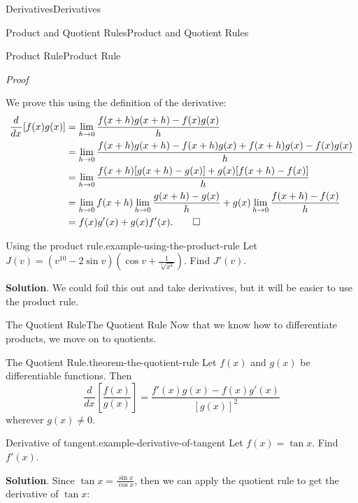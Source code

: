 \documentclass[10pt,]{book}
\makeatletter
\renewcommand*{\proofname}{Proof}
\renewenvironment{proof}[1][\proofname]{\par
  \pushQED{\qed}%
  \normalfont \topsep6\p@\@plus6\p@\relax
  \trivlist
  \item\relax
    {\itshape
    #1\@addpunct{.}}\hspace\labelsep\ignorespaces
}{%
  \popQED\endtrivlist\@endpefalse
}
\numberwithin{equation}{section}
\newcommand{\dv}[3][]{\dfrac{d^{#1} #2}{d #3^{#1}}}
\makeatother
\begin{document}
\begin{chapterptx}{Derivatives}{}{Derivatives}{}{}
\begin{sectionptx}{Product and Quotient Rules}{}{Product and Quotient Rules}{}{}
\begin{subsectionptx}{Product Rule}{}{Product Rule}{}{}
\begin{proof}
\hypertarget{p-141}{}%
We prove this using the definition of the derivative:%
\begin{align*}
\dv{}{x}[f(x)g(x)] & = \lim_{h\to0}\frac{f(x+h)g(x+h) - f(x)g(x)}{h} \\
& = \lim_{h\to0}\frac{f(x+h)g(x+h) - f(x+h)g(x) + f(x+h)g(x) - f(x)g(x)}{h} \\
& = \lim_{h\to0}\frac{f(x+h)[g(x+h) - g(x)] + g(x)[f(x+h) - f(x)]}{h} \\
& = \lim_{h\to0}f(x+h)\lim_{h\to0}\frac{g(x+h) - g(x)}{h} + g(x)\lim_{h\to0}\frac{f(x+h) - f(x)}{h} \\
& = f(x)g'(x) + g(x)f'(x). \qedhere
\end{align*}
%
\end{proof}
\begin{example}{Using the product rule.}{example-using-the-product-rule}%
\hypertarget{p-142}{}%
Let \(J(v) = (v^{10} - 2\sin v)(\cos v + \frac{1}{\sqrt[3]{x^{4}}})\). Find \(J'(v)\).%
\par\smallskip%
\noindent\textbf{Solution}.\hypertarget{solution-28}{}\quad%
\hypertarget{p-143}{}%
We could foil this out and take derivatives, but it will be easier to use the product rule.%
\end{example}
\end{subsectionptx}
%
%
\typeout{************************************************}
\typeout{************************************************}
%
\begin{subsectionptx}{The Quotient Rule}{}{The Quotient Rule}{}{}\label{subsection-the-quotient-rule}
\hypertarget{p-144}{}%
Now that we know how to differentiate products, we move on to quotients.%
\begin{theorem}{The Quotient Rule.}{}{theorem-the-quotient-rule}%
\hypertarget{p-145}{}%
Let \(f(x)\) and \(g(x)\) be differentiable functions. Then%
\begin{equation*}
\dv{}{x}\left[\frac{f(x)}{g(x)}\right] = \frac{f'(x)g(x) - f(x)g'(x)}{[g(x)]^{2}}
\end{equation*}
wherever \(g(x)\neq0\).%
\end{theorem}
\begin{example}{Derivative of tangent.}{example-derivative-of-tangent}%
\hypertarget{p-146}{}%
Let \(f(x) = \tan x\). Find \(f'(x)\).%
\par\smallskip%
\noindent\textbf{Solution}.\hypertarget{solution-29}{}\quad%
\hypertarget{p-147}{}%
Since \(\tan x = \frac{\sin x}{\cos x}\), then we can apply the quotient rule to get the derivative of \(\tan x\):%

\end{example}
\end{subsectionptx}
\end{sectionptx}
\end{chapterptx}
\end{document}
